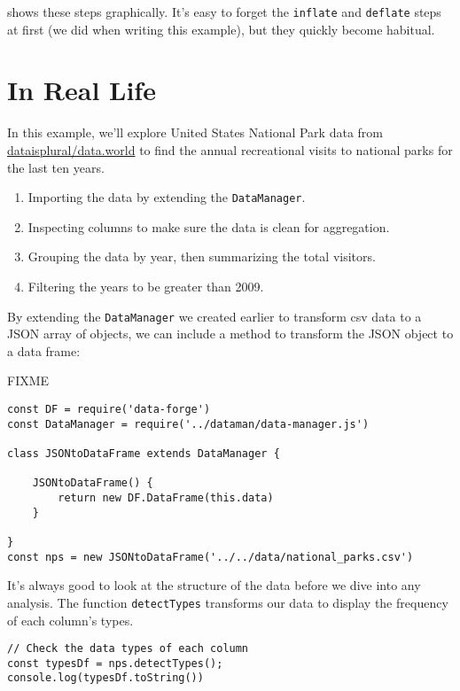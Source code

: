  shows these steps graphically.
It's easy to forget the \texttt{inflate} and \texttt{deflate} steps at first
(we did when writing this example),
but they quickly become habitual.


\section{In Real Life}\label{s:dataforge-real}

In this example, 
we'll explore United States National Park data from \url{dataisplural/data.world}
to find the annual recreational visits to national parks for the last ten years.

\begin{enumerate}
\item
  Importing the data by extending the \texttt{DataManager}.
\item
  Inspecting columns to make sure the data is clean for aggregation.
\item
  Grouping the data by year, then summarizing the total visitors.
\item
  Filtering the years to be greater than 2009.
\end{enumerate}

By extending the \texttt{DataManager} we created earlier
to transform csv data to a JSON array of objects, 
we can include a method to transform the JSON object to a data frame:

FIXME
\begin{verbatim}
const DF = require('data-forge')
const DataManager = require('../dataman/data-manager.js')

class JSONtoDataFrame extends DataManager {

    JSONtoDataFrame() {
        return new DF.DataFrame(this.data)
    } 

}
const nps = new JSONtoDataFrame('../../data/national_parks.csv')
\end{verbatim}

It's always good
to look at the structure of the data before we dive into any analysis.
The function \texttt{detectTypes} transforms our data
to display the frequency of each column's types.

\begin{verbatim}
// Check the data types of each column
const typesDf = nps.detectTypes(); 
console.log(typesDf.toString())
\end{verbatim}

